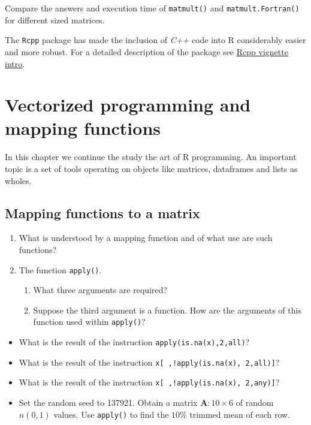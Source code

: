 \documentclass[
]{book}
\begin{document}
Compare the answers and execution time of \texttt{matmult()} and \texttt{matmult.Fortran()} for different sized matrices.

The \texttt{Rcpp} package has made the inclusion of \emph{{C++}} code into R considerably easier and more robust. For a detailed description of the package see \href{https://cran.r-project.org/web/packages/Rcpp/vignettes/Rcpp-introduction.pdf}{Rcpp vignette intro}.

\chapter{Vectorized programming and mapping functions}\label{mapping}

In this chapter we continue the study the art of R programming. An important topic is a set of tools operating on objects like matrices, dataframes and lists as wholes.

\section{Mapping functions to a matrix}\label{mapping-functions-to-a-matrix}

\begin{enumerate}
\def\labelenumi{(\alph{enumi})}
\item
  What is understood by a mapping function and of what use are such functions?
\item
  The function \texttt{apply()}.

  \begin{enumerate}
  \def\labelenumii{(\roman{enumii})}
  \item
    What three arguments are required?
  \item
    Suppose the third argument is a function. How are the arguments of this function used within \texttt{apply()}?
  \end{enumerate}
\end{enumerate}

\begin{itemize}
\item
  What is the result of the instruction \texttt{apply(is.na(x),2,all)}?
\item
  What is the result of the instruction \texttt{x{[}\ ,!apply(is.na(x),\ 2,all){]}}?
\item
  What is the result of the instruction \texttt{x{[}\ ,!apply(is.na(x),\ 2,any){]}}?
\item
  Set the random seed to 137921. Obtain a matrix \(\mathbf{A}:10 \times 6\) of random \(n(0, 1)\) values. Use \texttt{apply()} to find the \(10\%\) trimmed mean of each row.
\end{itemize}
\end{document}
